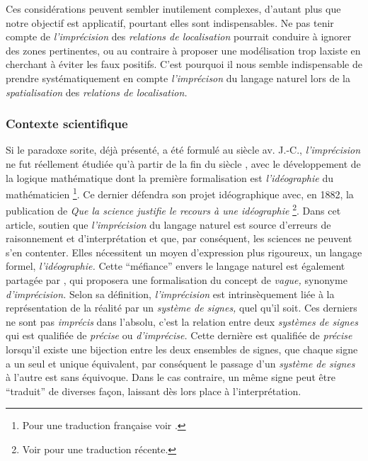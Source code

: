 
Ces considérations peuvent sembler inutilement complexes, d'autant
plus que notre objectif est applicatif, pourtant elles sont
indispensables. Ne pas tenir compte de \emph{l'imprécision} des
\emph{relations de localisation} pourrait conduire à ignorer des zones
pertinentes, ou au contraire à proposer une modélisation trop laxiste
en cherchant à éviter les faux positifs. C'est pourquoi il nous semble
indispensable de prendre systématiquement en compte
\emph{l'imprécison} du langage naturel lors de la
\emph{spatialisation} des \emph{relations de localisation.}

\subsubsection{Contexte scientifique}

Si le paradoxe sorite, déjà présenté, a été formulé au
 siècle av. J.-C., \emph{l'imprécision} ne fut
réellement étudiée qu'à partir de la fin du  siècle
\autocite{Williamson1994}, avec le développement de la logique
mathématique dont la première formalisation est \emph{l'idéographie}
du mathématicien \textcite{Frege1879} \footnote{Pour une traduction
  française voir \textcite{Frege1999}.}. Ce dernier défendra son
projet idéographique avec, en 1882, la publication de \emph{Que la
  science justifie le recours à une idéographie} \autocite{Frege1882}
\footnote{Voir \textcite{Frege2019} pour une traduction
  récente.}. Dans cet article,  soutien que
\emph{l'imprécision} du langage naturel est source d'erreurs de
raisonnement et d'interprétation et que, par conséquent, les sciences
ne peuvent s'en contenter. Elles nécessitent un moyen d'expression
plus rigoureux, un langage formel, \emph{l'idéographie.} Cette
\enquote{méfiance} envers le langage naturel est également partagée
par \textcite{Russell1923}, qui proposera une formalisation du concept
de \emph{vague,} synonyme \emph{d'imprécision.} Selon sa définition,
\emph{l'imprécision} est intrinsèquement liée à la représentation de
la réalité par un \emph{système de signes,} quel qu'il soit. Ces
derniers ne sont pas \emph{imprécis} dans l'absolu, c'est la relation
entre deux \emph{systèmes de signes} qui est qualifiée de
\emph{précise} ou \emph{d'imprécise.} Cette dernière est qualifiée de
\emph{précise} lorsqu'il existe une bijection entre les deux ensembles
de signes, \ie que chaque signe a un seul et unique équivalent, par
conséquent le passage d'un \emph{système de signes} à l'autre est sans
équivoque. Dans le cas contraire, un même signe peut être
\enquote{traduit} de diverses façon, laissant dès lors place à
l'interprétation.

